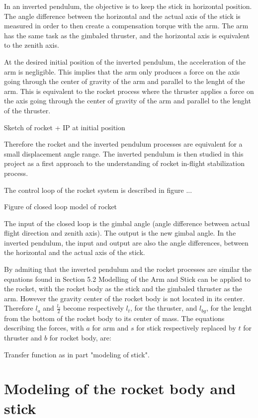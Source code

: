 In an inverted pendulum, the objective is to keep the stick in horizontal position. The angle difference between the horizontal and the actual axis of the stick is measured in order to then create a compensation torque with the arm. The arm has the same task as the gimbaled thruster, and the horizontal axis is equivalent to the zenith axis.

At the desired initial position of the inverted pendulum, the acceleration of the arm is negligible. This implies that the arm only produces a force on the axis going through the center of gravity of the arm and parallel to the lenght of the arm. This is equivalent to the rocket process where the thruster applies a force on the axis going through the center of gravity of the arm and parallel to the lenght of the thruster. 

 Sketch of rocket + IP at initial position

Therefore the rocket and the inverted pendulum processes are equivalent for a small displacement angle range. The inverted pendulum is then studied in this project as a first approach to the understanding of rocket in-flight stabilization process.

The control loop of the rocket system is described in figure ...

Figure of closed loop model of rocket

The input of the closed loop is the gimbal angle (angle difference between actual flight direction and zenith axis). The output is the new gimbal angle. In the inverted pendulum, the input and output are also the angle differences, between the horizontal and the actual axis of the stick. 

By admiting that the inverted pendulum and the rocket processes are similar the equations found in Section 5.2 Modelling of the Arm and Stick can be applied to the rocket, with the rocket body as the stick and the gimbaled thruster as the arm. However the gravity center of the rocket body is not located in its center. Therefore $l_{a}$ and $\frac{l_{s}}{2}$ become respectively $l_{t}$, for the thruster, and $l_{bg}$, for the lenght from the bottom of the rocket body to its center of mass. The equations describing the forces, with $a$ for arm and $s$ for stick respectively replaced by $t$ for thruster and $b$ for rocket body, are:

Transfer function as in part "modeling of stick".

	\section{Modeling of the rocket body and stick}
	
